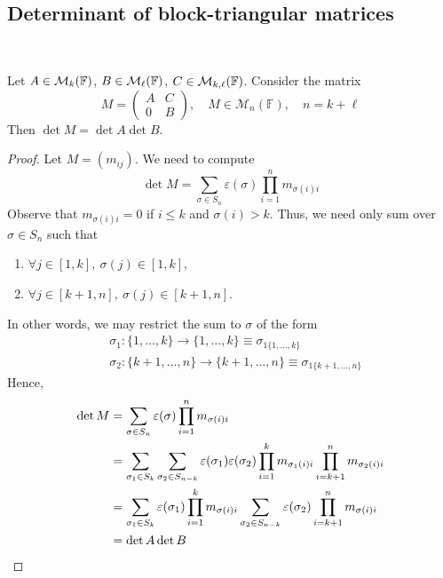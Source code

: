 \documentclass[a4paper,11pt]{article}
\begin{document}
\subsection{Determinant of block-triangular matrices}\ \vspace{-1.5em}
\begin{lemma}
	Let $ A \in {\mathcal{M}}_k({\mathbb{F}}) $, $ B \in {\mathcal{M}}_\ell({\mathbb{F}}) $, $ C \in {\mathcal{M}}_{k, \ell}({\mathbb{F}}) $.
	Consider the matrix
	\[
		M = \begin{pmatrix}
			A & C \\
			0 & B
		\end{pmatrix},\quad M\in \mathcal{M}_{n}(\mathbb{F}),\quad n = k+\ell
	\]
	Then $ \det M = \det A \det B $.
\end{lemma}
\begin{proof}
	Let $ M = (m_{ij}) $.
	We need to compute
	\[
		\det M = \sum_{\sigma \in S_n} \varepsilon(\sigma) \prod_{i=1}^n m_{\sigma(i) i}
	\]
	Observe that $ m_{\sigma(i) i} = 0 $ if $ i \leq k $ and $ \sigma(i) > k $.
	Thus, we need only sum over $ \sigma\in S_n $ such that 
	\begin{enumerate}
		\item $ \forall j\in [1,k],\ \sigma(j)\in [1,k] $,
		\item $ \forall j\in [k+1, n], \ \sigma(j)\in [k+1,n] $. 
	\end{enumerate}
	In other words, we may restrict the sum to $ \sigma $ of the form 
	\begin{align*}
		& \sigma_1 : \{1,\dots,k\} \to \{1,\dots,k\} \equiv \sigma_{1 \{1,\dots,k\}}\\ 
		& \sigma_2 : \{k+1,\dots,n\} \to \{k+1,\dots,n\} \equiv \sigma_{1 \{k+1,\dots,n\}}
	\end{align*}
	Hence,
	\begin{align*}
		\det M & = \sum_{\sigma \in S_n} \varepsilon(\sigma) \prod_{i=1}^n m_{\sigma(i) i}                                                         \\
		       & = \sum_{\sigma_1 \in S_k} \sum_{\sigma_2 \in S_{n-k}} \varepsilon(\sigma_1) \varepsilon(\sigma_2) \prod_{i=1}^k m_{\sigma_1(i) i} \prod_{i=k+1}^n m_{\sigma_2(i) i} \\
		       & = \sum_{\sigma_1 \in S_k} \varepsilon(\sigma_1) \prod_{i=1}^k m_{\sigma(i) i} \sum_{\sigma_2 \in S_{n-k}} \varepsilon(\sigma_2) \prod_{i=k+1}^n m_{\sigma(i) i} \\
		       & = \det A \det B\qedhere
	\end{align*}
\end{proof}
\end{document}
